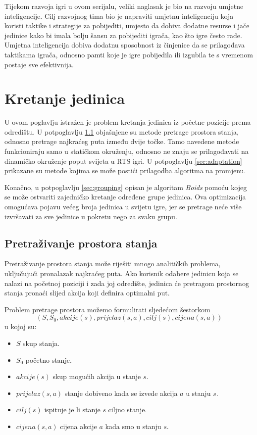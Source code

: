 \documentclass[times, utf8, zavrsni, numeric]{fer}
\begin{document}
\par Tijekom razvoja igri u ovom serijalu, veliki naglasak je bio na razvoju umjetne inteligencije.
Cilj razvojnog tima bio je napraviti umjetnu inteligenciju koja koristi taktike i strategije za pobijediti, umjesto da dobiva dodatne resurse i jače jedinice kako bi imala bolju šansu za pobijediti igrača, kao što igre često rade.
Umjetna inteligencija dobiva dodatnu sposobnost iz činjenice da se prilagođava taktikama igrača, odnosno pamti koje je igre pobijedila ili izgubila te s vremenom postaje sve efektivnija.  

\chapter{Kretanje jedinica}\label{ch:pathfinding}

\par U ovom poglavlju istražen je problem kretanja jedinica iz početne pozicije prema odredištu. 
U potpoglavlju \ref{sec:stateSearch} objašnjene su metode pretrage prostora stanja, odnosno pretrage najkraćeg puta između dvije točke.
Tamo navedene metode funkcioniraju samo u statičkom okruženju, odnosno ne znaju se prilagođavati na dinamičko okruženje poput svijeta u RTS igri.
U potpoglavlju \ref{sec:adaptation} prikazane su metode kojima se može postići prilagodba algoritma na promjenu.

\par Konačno, u potpoglavlju \ref{sec:grouping} opisan je algoritam \textit{Boids} pomoću kojeg se može ostvariti zajedničko kretanje određene grupe jedinica.
Ova optimizacija omogućava pojavu većeg broja jedinica u svijetu igre, jer se pretrage neće više izvršavati za sve jedinice u pokretu nego za svaku grupu.

\section{Pretraživanje prostora stanja}\label{sec:stateSearch}

\par Pretraživanje prostora stanja može riješiti mnogo analitičkih problema, uključujući pronalazak najkraćeg puta. 
Ako korisnik odabere jedinicu koja se nalazi na početnoj poziciji i zada joj odredište, jedinica će pretragom prostornog stanja pronaći slijed akcija koji definira optimalni put.

\par Problem pretrage prostora možemo formulirati sljedećom šestorkom
\[(S, S_0, akcije(s), prijelaz(s, a), cilj(s), cijena(s, a))\]
u kojoj su:
\begin{itemize}
    \item \(S\) skup stanja.
    \item \(S_0\) početno stanje.
    \item \(akcije(s)\) skup mogućih akcija u stanje \(s\).
    \item \(prijelaz(s, a)\) stanje dobiveno kada se izvede akcija \(a\) u stanju \(s\).
    \item \(cilj(s)\) ispituje je li stanje \(s\) ciljno stanje.
    \item \(cijena(s, a)\) cijena akcije \(a\) kada smo u stanju \(s\). 
\end{itemize}
\end{document}
